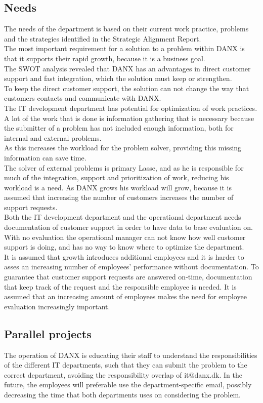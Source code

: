 \subsection{Needs}
The needs of the department is based on their current work practice, problems and the strategies identified in the Strategic Alignment Report.\\
The most important requirement for a solution to a problem within DANX is that it supports their rapid growth, because it is a business goal.\\
The SWOT analysis revealed that DANX has an advantages in direct customer support and fast integration, which the solution must keep or strengthen.\\
To keep the direct customer support, the solution can not change the way that customers contacts and communicate with DANX.\\
The IT development department has potential for optimization of work practices. A lot of the work that is done is information gathering that is necessary because the submitter of a problem has not included enough information, both for internal and external problems.\cite{lasse010}\\
As this increases the workload for the problem solver, providing this missing information can save time.\\
The solver of external problems is primary Lasse, and as he is responsible for much of the integration, support and prioritization of work, reducing his workload is a need. As DANX grows his workload will grow, because it is assumed that increasing the number of customers increases the number of support requests.\\
Both the IT development department and the operational department needs documentation of customer support in order to have data to base evaluation on. With no evaluation the operational manager can not know how well customer support is doing, and has no way to know where to optimize the department.\\
It is assumed that growth introduces additional employees and it is harder to asses an increasing number of employees’ performance without documentation. To guarantee that customer support requests are answered on-time, documentation that keep track of the request and the responsible employee is needed. It is assumed that an increasing amount of employees makes the need for employee evaluation increasingly important.

\subsection{Parallel projects}
The operation of DANX is educating their staff to understand the responsibilities of the different IT departments, such that they can submit the problem to the correct department, avoiding the responsibility overlap of it@danx.dk. In the future, the employees will preferable use the department-specific email, possibly decreasing the time that both departments uses on considering the problem.\cite{gert017}


